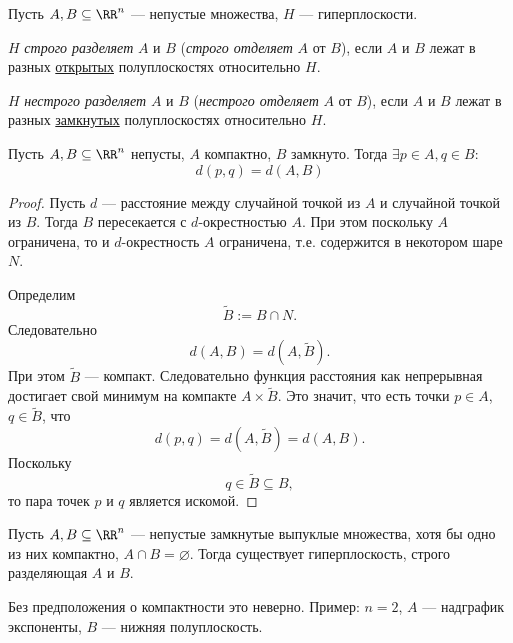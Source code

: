 \documentclass[12pt,a4paper]{article}
\begin{document}
    \begin{definition}
        Пусть $A, B \subseteq \RR^n$ --- непустые множества, $H$ --- гиперплоскости.

        $H$ \emph{строго разделяет} $A$ и $B$ (\emph{строго отделяет} $A$ от $B$), если $A$ и $B$ лежат в разных \underline{открытых} полуплоскостях относительно $H$.

        $H$ \emph{нестрого разделяет} $A$ и $B$ (\emph{нестрого отделяет} $A$ от $B$), если $A$ и $B$ лежат в разных \underline{замкнутых} полуплоскостях относительно $H$.
    \end{definition}

    \begin{lemma}\label{closed-and-compact-sets-distance-representatives-lemma}
        Пусть $A, B \subseteq \RR^n$ непусты, $A$ компактно, $B$ замкнуто. Тогда $\exists p \in A, q \in B:$
        \[d(p, q) = d(A, B)\]
    \end{lemma}

    \begin{proof}
        Пусть $d$ --- расстояние между случайной точкой из $A$ и случайной точкой из $B$. Тогда $B$ пересекается с $d$-окрестностью $A$. При этом поскольку $A$ ограничена, то и $d$-окрестность $A$ ограничена, т.е. содержится в некотором шаре $N$.
        
        Определим
        \[\widetilde{B} := B \cap N.\]
        Следовательно
        \[d(A, B) = d(A, \widetilde{B}).\]
        При этом $\widetilde{B}$ --- компакт. Следовательно функция расстояния как непрерывная достигает свой минимум на компакте $A \times \widetilde{B}$. Это значит, что есть точки $p \in A$, $q \in \widetilde{B}$, что
        \[d(p, q) = d(A, \widetilde{B}) = d(A, B).\]
        Поскольку
        \[q \in \widetilde{B} \subseteq B,\]
        то пара точек $p$ и $q$ является искомой.
    \end{proof}

    \begin{theorem}
        Пусть $A, B \subseteq \RR^n$ --- непустые замкнутые выпуклые множества, хотя бы одно из них компактно, $A \cap B = \varnothing$. Тогда существует гиперплоскость, строго разделяющая $A$ и $B$.
    \end{theorem}

    \begin{remark}
        Без предположения о компактности это неверно. Пример: $n=2$, $A$ --- надграфик экспоненты, $B$ --- нижняя полуплоскость.
    \end{remark}
\end{document}
